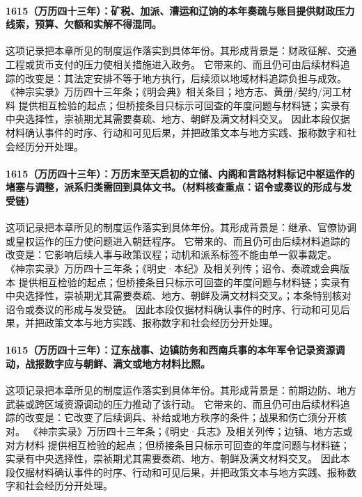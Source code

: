 \paragraph{1615（万历四十三年）：矿税、加派、漕运和辽饷的本年奏疏与账目提供财政压力线索，预算、欠额和实解不得混同。} 这项记录把本章所见的制度运作落实到具体年份。其形成背景是：财政征解、交通工程或货币支付的压力使相关措施进入政务。 它带来的、而且仍可由后续材料追踪的改变是：其法定安排不等于地方执行，后续须以地域材料追踪负担与成效。 《神宗实录》万历四十三年条；《明会典》相关条目；地方志、黄册/契约/河工材料 提供相互检验的起点；但桥接条目只标示可回查的年度问题与材料链；实录有中央选择性，崇祯期尤其需要奏疏、地方、朝鲜及满文材料交叉。 因此本段仅据材料确认事件的时序、行动和可见后果，并把政策文本与地方实践、报称数字和社会经历分开处理。

\paragraph{1615（万历四十三年）：万历末至天启初的立储、内阁和言路材料标记中枢运作的堵塞与调整，派系归类需回到具体文书。（材料核查重点：诏令或奏议的形成与发受链）} 这项记录把本章所见的制度运作落实到具体年份。其形成背景是：继承、官僚协调或皇权运作的压力使问题进入朝廷程序。 它带来的、而且仍可由后续材料追踪的改变是：它影响后续人事与政策议程；动机和派系标签不能由单一叙事裁定。 《神宗实录》万历四十三年条；《明史·本纪》及相关列传；诏令、奏疏或会典版本 提供相互检验的起点；但桥接条目只标示可回查的年度问题与材料链；实录有中央选择性，崇祯期尤其需要奏疏、地方、朝鲜及满文材料交叉。；本条特别核对诏令或奏议的形成与发受链。 因此本段仅据材料确认事件的时序、行动和可见后果，并把政策文本与地方实践、报称数字和社会经历分开处理。

\paragraph{1615（万历四十三年）：辽东战事、边镇防务和西南兵事的本年军令记录资源调动，战报数字应与朝鲜、满文或地方材料比照。} 这项记录把本章所见的制度运作落实到具体年份。其形成背景是：前期边防、地方武装或跨区域资源调动的压力推动了该行动。 它带来的、而且仍可由后续材料追踪的改变是：它改变了后续调兵、补给或地方秩序的条件；战果和伤亡须分开核对。 《神宗实录》万历四十三年条；《明史·兵志》及相关列传；边镇、地方志或对方材料 提供相互检验的起点；但桥接条目只标示可回查的年度问题与材料链；实录有中央选择性，崇祯期尤其需要奏疏、地方、朝鲜及满文材料交叉。 因此本段仅据材料确认事件的时序、行动和可见后果，并把政策文本与地方实践、报称数字和社会经历分开处理。

